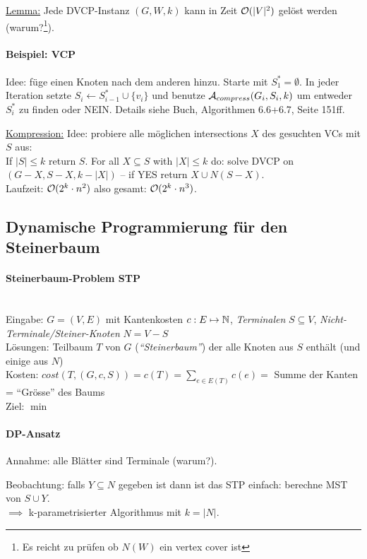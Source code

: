 \underline{Lemma:}
Jede DVCP-Instanz $(G, W, k)$ kann in Zeit $\mathcal{O} (|V|^2)$ gelöst werden (warum?\footnote{
Es reicht zu prüfen ob $N(W)$ ein vertex cover ist}).

\paragraph{Beispiel: VCP}
Idee: füge einen Knoten nach dem anderen hinzu.
Starte mit $S_1^* = \emptyset$. In jeder Iteration setzte $S_i \leftarrow S_{i-1}^* \cup \{v_i\}$ und benutze
$\mathcal{A}_{compress}(G_i, S_i, k)$ um entweder $S_i^*$ zu finden oder NEIN.
Details siehe Buch, Algorithmen 6.6+6.7, Seite 151ff.

\underline{Kompression:} Idee: probiere alle möglichen intersections $X$ des gesuchten VCs mit $S$ aus: \\
If $|S| \leq k$ return $S$.
For all $X \subseteq S$ with $|X| \leq k$ do:
solve DVCP on $(G-X, S-X, k-|X|)$
-- if YES return $X \cup N(S-X)$.
\\
Laufzeit: $\mathcal{O} (2^k \cdot n^2)$ also gesamt: $\mathcal{O} (2^k \cdot n^3)$.


\subsection{Dynamische Programmierung für den Steinerbaum}

\paragraph{Steinerbaum-Problem STP} \mbox{} \\
Eingabe: $G=(V,E)$ mit Kantenkosten $c : E \mapsto \mathbb{N}$, \emph{Terminalen} $S \subseteq V$,
\emph{Nicht-Terminale/Steiner-Knoten} $N = V-S$ \\
Lösungen: Teilbaum $T$ von $G$ (\emph{``Steinerbaum''}) der alle Knoten aus $S$ enthält (und einige aus $N$) \\
Kosten: $cost(T, (G,c,S)) = c(T) = \sum_{e\in E(T)} c(e) = $ Summe der Kanten = ``Grösse'' des Baums \\
Ziel: $\min$

\paragraph{DP-Ansatz}
Annahme: alle Blätter sind Terminale (warum?).

Beobachtung: falls $Y \subseteq N$ gegeben ist dann ist das STP einfach: berechne MST von $S \cup Y$. \\
$\implies$ k-parametrisierter Algorithmus mit $k = |N|$.

